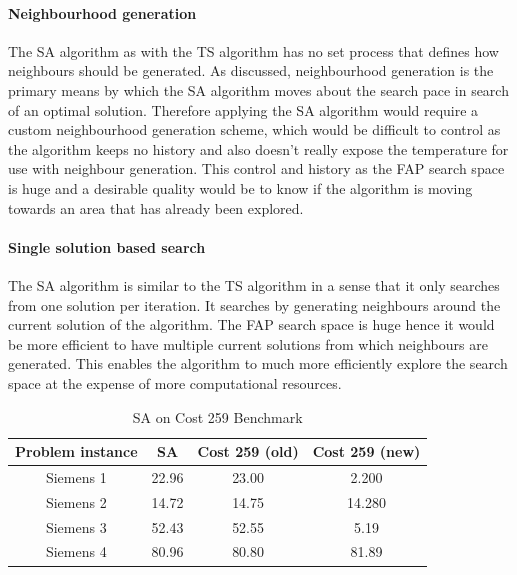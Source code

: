\paragraph{Neighbourhood generation}
The SA algorithm as with the TS algorithm has no set process that defines how neighbours should be generated. As discussed, neighbourhood generation is the primary means by which the SA algorithm moves about the search pace in search of an optimal solution. Therefore applying the SA algorithm would require a custom neighbourhood generation scheme, which would be difficult to control as the algorithm keeps no history and also doesn't really expose the temperature for use with neighbour generation. This control and history as the FAP search space is huge and a desirable quality would be to know if the algorithm is moving towards an area that has already been explored.
\paragraph{Single solution based search}
The SA algorithm is similar to the TS algorithm in a sense that it only searches from one solution per iteration. It searches by generating neighbours around the current solution of the algorithm. The FAP search space is huge hence it would be more efficient to have multiple current solutions from which neighbours are generated. This enables the algorithm to much more efficiently explore the search space at the expense of more computational resources.
\begin{table}
\centering
	\begin{tabular}{| c | c | c | c |}
	\hline
	Problem instance & SA & Cost 259 (old) & Cost 259 (new) \\ \hline
	Siemens 1 & 22.96 & 23.00 & 2.200\\ \hline
	Siemens 2 & 14.72 & 14.75 & 14.280\\ \hline
	Siemens 3 & 52.43 & 52.55 & 5.19\\ \hline
	Siemens 4 & 80.96 & 80.80 & 81.89\\ \hline
	\end{tabular}
\caption{SA on Cost 259 Benchmark}
\end{table}

